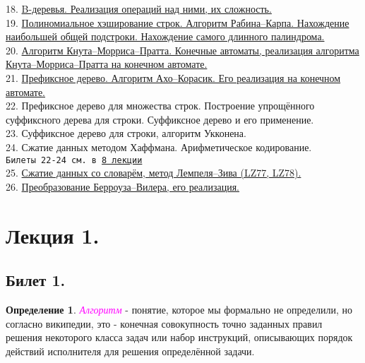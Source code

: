 \documentclass[a4paper]{article}
\theoremstyle{indented}
\theoremstyle{definition}
\newtheorem{defn}{Определение}
\theoremstyle{remark}
\begin{document}
18. \hyperlink{t29}{B-деревья. Реализация операций над ними, их сложность.} \\ 

19. \hyperlink{t30}{Полиномиальное хэширование строк. Алгоритм Рабина–Карпа. Нахождение наибольшей общей подстроки. Нахождение самого длинного палиндрома.}  \\ 

20. \hyperlink{e3}{Алгоритм Кнута–Морриса–Пратта. Конечные автоматы, реализация алгоритма Кнута–Морриса–Пратта на конечном автомате.} \\ 

21. \hyperlink{t32}{Префиксное дерево. Алгоритм Ахо–Корасик. Его реализация на конечном автомате.} \\ 

22. Префиксное дерево для множества строк. Построение упрощённого суффиксного дерева для строки. Суффиксное дерево и его применение. \\ 

23. Суффиксное дерево для строки, алгоритм Укконена.  \\ 

24. Сжатие данных методом Хаффмана. Арифметическое кодирование. \\ 

\texttt{Билеты 22-24 см. в \href{https://users.math-cs.spbu.ru/~okhotin/teaching/algorithms_2020/okhotin_algorithms_2020_l8.pdf}{8 лекции}} \\

25. \hyperlink{t35}{Сжатие данных со словарём, метод Лемпеля–Зива (LZ77, LZ78).} \\ 

26. \hyperlink{t37}{Преобразование Берроуза–Вилера, его реализация.}

\newpage

\section{Лекция 1.} 

\subsection{Билет 1.}

\begin{defn}
    \textcolor{magenta}{\hypertarget{d-1}{\textit{Алгоритм}}} - понятие, которое мы формально не определили, но согласно википедии, это - конечная совокупность точно заданных правил решения некоторого класса задач или набор инструкций, описывающих порядок действий исполнителя для решения определённой задачи. 
\end{defn}
\end{document}
